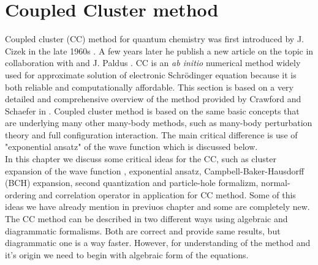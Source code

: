\documentclass[twoside,english]{uiofysmaster}
\theoremstyle{definition}
\begin{document}
\chapter{Coupled Cluster method} \label{ch:coupled_cluster}
Coupled cluster (CC) method for quantum chemistry was first introduced by J. Cizek in the late 1960s \cite{cizekCorrelationProblemsAtomic}. A few years later he publish a new article on the topic in collaboration with and J. Paldus \cite{cizekCorrelationProblemAtomic1966}. CC is an \textit{ab initio} numerical method widely used for approximate solution of electronic Schr\"{o}dinger equation because it is both reliable and computationally affordable. This section is based on a very detailed and comprehensive overview of the method provided by Crawford and Schaefer in \cite{crawfordIntroductionCoupledCluster2007}. Coupled cluster method is based on the same basic concepts that are underlying many other many-body methods, such as many-body perturbation theory and full configuration interaction. The main critical difference is use of "exponential ansatz" of the wave function which is discussed below.\\
In this chapter we discuss some critical ideas for the CC, such as cluster expansion of the wave function , exponential ansatz, Campbell-Baker-Hausdorff (BCH) expansion, second quantization and particle-hole formalizm, normal-ordering and correlation operator in application for CC method. Some of this ideas we have already mention in previuos chapter and some are completely new. The CC method can be described in two different ways using algebraic and diagrammatic formalisms. Both are correct and provide same results, but diagrammatic one is a way faster. However, for understanding of the method and it's origin we need to begin with algebraic form of the equations.\\
\end{document}
